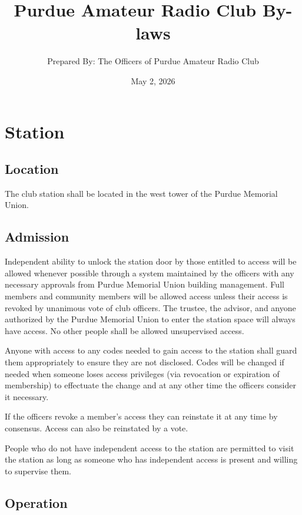\documentclass{article}
\title{\vspace*{\fill}Purdue Amateur Radio Club By-laws}
\author{Prepared By: The Officers of Purdue Amateur Radio Club}
\date{May 2, 2026\vspace*{\fill}\vspace*{\fill}}
\begin{document}
\maketitle
\newpage

\tableofcontents
\newpage

\section{Station}

\subsection{Location}

The club station shall be located in the west tower of the Purdue Memorial
Union.

\subsection{Admission}

Independent ability to unlock the station door by those entitled to access will
be allowed whenever possible through a system maintained by the officers with
any necessary approvals from Purdue Memorial Union building management. Full
members and community members will be allowed access unless their access is
revoked by unanimous vote of club officers. The trustee, the advisor, and anyone
authorized by the Purdue Memorial Union to enter the station space will always
have access. No other people shall be allowed unsupervised access.

Anyone with access to any codes needed to gain access to the station shall guard
them appropriately to ensure they are not disclosed. Codes will be changed if
needed when someone loses access privileges (via revocation or expiration of
membership) to effectuate the change and at any other time the officers consider
it necessary.

If the officers revoke a member's access they can reinstate it at any time by
consensus. Access can also be reinstated by a vote.

People who do not have independent access to the station are permitted to visit
the station as long as someone who has independent access is present and willing
to supervise them.

\subsection{Operation}
\end{document}
